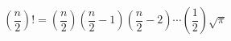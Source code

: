 

\[
\left( \frac{n}{2} \right) ! = 
\left( \frac{n}{2} \right) 
\left( \frac{n}{2} - 1 \right) 
\left( \frac{n}{2} - 2 \right) 
 \cdots
\left( \frac{1}{2} \right) \sqrt{\pi}
\]


